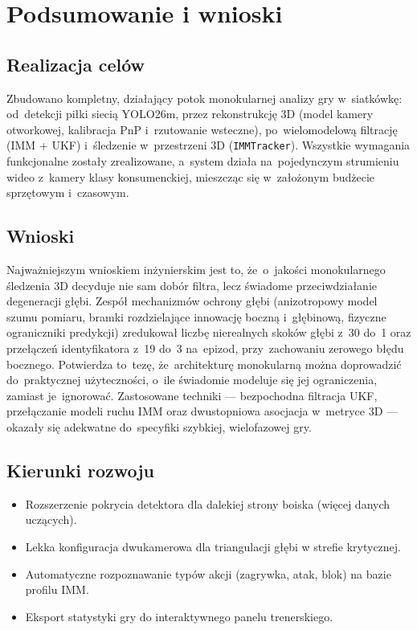 \documentclass[14pt,a4paper]{extarticle}
\begin{document}
\section{Podsumowanie i wnioski}

\subsection{Realizacja celów}
Zbudowano kompletny, działający potok monokularnej analizy gry w~siatkówkę: od~detekcji
piłki siecią YOLO26m, przez rekonstrukcję 3D (model kamery otworkowej, kalibracja PnP
i~rzutowanie wsteczne), po~wielomodelową filtrację (IMM + UKF) i~śledzenie w~przestrzeni
3D (\texttt{IMMTracker}). Wszystkie wymagania funkcjonalne zostały zrealizowane, a~system
działa na~pojedynczym strumieniu wideo z~kamery klasy konsumenckiej, mieszcząc się
w~założonym budżecie sprzętowym i~czasowym.

\subsection{Wnioski}
Najważniejszym wnioskiem inżynierskim jest to, że~o~jakości monokularnego śledzenia 3D
decyduje nie sam dobór filtra, lecz świadome przeciwdziałanie degeneracji głębi. Zespół
mechanizmów ochrony głębi (anizotropowy model szumu pomiaru, bramki rozdzielające
innowację boczną i~głębinową, fizyczne ograniczniki predykcji) zredukował liczbę
nierealnych skoków głębi z~30 do~1 oraz przełączeń identyfikatora z~19 do~3 na~epizod,
przy~zachowaniu zerowego błędu bocznego. Potwierdza to~tezę, że~architekturę monokularną
można doprowadzić do~praktycznej użyteczności, o~ile świadomie modeluje się jej
ograniczenia, zamiast je~ignorować. Zastosowane techniki — bezpochodna filtracja UKF,
przełączanie modeli ruchu IMM oraz dwustopniowa asocjacja w~metryce 3D — okazały się
adekwatne do~specyfiki szybkiej, wielofazowej gry.

\subsection{Kierunki rozwoju}
\begin{itemize}[leftmargin=1.4em, itemsep=2pt]
  \item Rozszerzenie pokrycia detektora dla dalekiej strony boiska (więcej danych uczących).
  \item Lekka konfiguracja dwukamerowa dla triangulacji głębi w strefie krytycznej.
  \item Automatyczne rozpoznawanie typów akcji (zagrywka, atak, blok) na bazie profilu IMM.
  \item Eksport statystyki gry do interaktywnego panelu trenerskiego.
\end{itemize}
\end{document}
